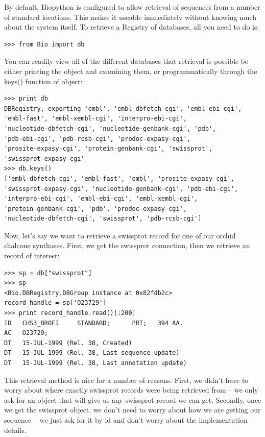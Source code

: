 \documentclass{report}
\begin{document}
By default, Biopython is configured to allow retrieval of sequences from
a number of standard locations. This makes it useable immediately
without knowing much about the system itself. To retrieve a Registry of
databases, all you need to do is:

\begin{verbatim}
>>> from Bio import db
\end{verbatim}

You can readily view all of the different databases that retrieval is
possible be either printing the object and examining them, or
programmatically through the keys() function of object:

\begin{verbatim}
>>> print db
DBRegistry, exporting 'embl', 'embl-dbfetch-cgi', 'embl-ebi-cgi',
'embl-fast', 'embl-xembl-cgi', 'interpro-ebi-cgi',
'nucleotide-dbfetch-cgi', 'nucleotide-genbank-cgi', 'pdb',
'pdb-ebi-cgi', 'pdb-rcsb-cgi', 'prodoc-expasy-cgi',
'prosite-expasy-cgi', 'protein-genbank-cgi', 'swissprot',
'swissprot-expasy-cgi'
>>> db.keys()
['embl-dbfetch-cgi', 'embl-fast', 'embl', 'prosite-expasy-cgi',
'swissprot-expasy-cgi', 'nucleotide-genbank-cgi', 'pdb-ebi-cgi',
'interpro-ebi-cgi', 'embl-ebi-cgi', 'embl-xembl-cgi',
'protein-genbank-cgi', 'pdb', 'prodoc-expasy-cgi',
'nucleotide-dbfetch-cgi', 'swissprot', 'pdb-rcsb-cgi']
\end{verbatim}

Now, let's say we want to retrieve a swissprot record for one of our
orchid chalcone synthases. First, we get the swissprot connection, then
we retrieve an record of interest:

\begin{verbatim}
>>> sp = db["swissprot"]
>>> sp
<Bio.DBRegistry.DBGroup instance at 0x82fdb2c>
record_handle = sp['O23729']
>>> print record_handle.read()[:200]
ID   CHS3_BROFI     STANDARD;      PRT;   394 AA.
AC   O23729;
DT   15-JUL-1999 (Rel. 38, Created)
DT   15-JUL-1999 (Rel. 38, Last sequence update)
DT   15-JUL-1999 (Rel. 38, Last annotation update)
\end{verbatim}

This retrieval method is nice for a number of reasons. First, we didn't
have to worry about where exactly swissprot records were being retrieved
from -- we only ask for an object that will give us any swissprot record
we can get. Secondly, once we get the swissprot object, we don't need to
worry about how we are getting our sequence -- we just ask for it by id
and don't worry about the implementation details.
\end{document}
